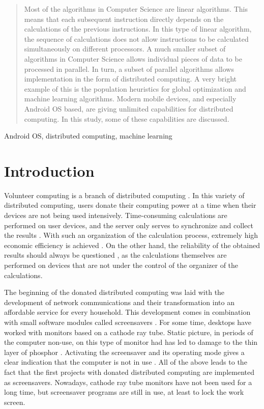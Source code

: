\documentclass[a4paper,conference]{IEEEtran}
\begin{document}
\begin{abstract}
Most of the algorithms in Computer Science are linear algorithms. This means that each subsequent instruction directly depends on the calculations of the previous instructions. In this type of linear algorithm, the sequence of calculations does not allow instructions to be calculated simultaneously on different processors. A much smaller subset of algorithms in Computer Science allows individual pieces of data to be processed in parallel. In turn, a subset of parallel algorithms allows implementation in the form of distributed computing. A very bright example of this is the population heuristics for global optimization and machine learning algorithms. Modern mobile devices, and especially Android OS based, are giving unlimited capabilities for distributed computing. In this study, some of these capabilities are discussed.
\end{abstract}

\begin{IEEEkeywords}
Android OS, distributed computing, machine learning
\end{IEEEkeywords}

\section{Introduction}

Volunteer computing \cite{Durrani-01} is a branch of distributed computing \cite{Lamport-01}. In this variety of distributed computing, users donate their computing power at a time when their devices are not being used intensively. Time-consuming calculations \cite{Meyerov-01} are performed on user devices, and the server only serves to synchronize and collect the results \cite{Geng-01}. With such an organization of the calculation process, extremely high economic efficiency is achieved \cite{Guler-01}. On the other hand, the reliability of the obtained results should always be questioned \cite{Heien-01}, as the calculations themselves are performed on devices that are not under the control of the organizer of the calculations. 

The beginning of the donated distributed computing was laid with the development of network communications and their transformation into an affordable service for every household. This development comes in combination with small software modules called screensavers \cite{Krieger-01}. For some time, desktops have worked with monitors based on a cathode ray tube. Static picture, in periods of the computer non-use, on this type of monitor had has led to damage to the thin layer of phosphor \cite{Pfahnl-01}. Activating the screensaver and its operating mode gives a clear indication that the computer is not in use \cite{Forcier-01}. All of the above leads to the fact that the first projects with donated distributed computing are implemented as screensavers. Nowadays, cathode ray tube monitors have not been used for a long time, but screensaver programs are still in use, at least to lock the work screen. 
\end{document}
